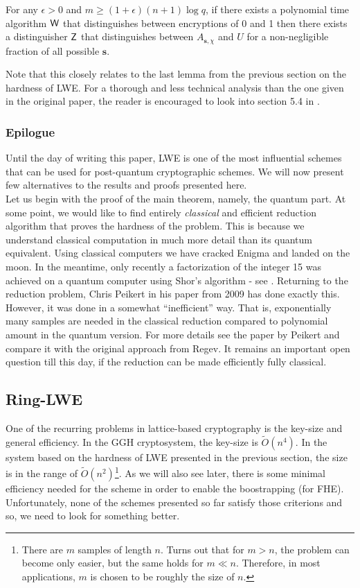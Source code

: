 \begin{proposition}
    For any $\epsilon > 0$ and $m \geq (1 + \epsilon)(n + 1) \log q$, if there exists a polynomial time algorithm $\alg{W}$ that distinguishes between encryptions of 0 and 1 then there exists a distinguisher $\alg{Z}$ that distinguishes between $A_{\bm{s}, \chi}$ and $U$ for a non-negligible fraction of all possible $\bm{s}$.
\end{proposition}
Note that this closely relates to the last lemma from the previous section on the hardness of LWE. For a thorough and less technical analysis than the one given in the original paper, the reader is encouraged to look into section 5.4 in \cite{Micci2009}.

\subsubsection*{Epilogue}
Until the day of writing this paper, LWE is one of the most influential schemes that can be used for post-quantum cryptographic schemes. We will now present few alternatives to the results and proofs presented here.\\

Let us begin with the proof of the main theorem, namely, the quantum part. At some point, we would like to find entirely \textit{classical} and efficient reduction algorithm that proves the hardness of the problem. This is because we understand classical computation in much more detail than its quantum equivalent. Using classical computers we have cracked Enigma and landed on the moon. In the meantime, only recently a factorization of the integer 15 was achieved on a quantum computer using Shor's algorithm - see . Returning to the reduction problem, Chris Peikert in his paper \cite{peikert_classical} from 2009 has done exactly this. However, it was done in a somewhat ``inefficient'' way. That is, exponentially many samples are needed in the classical reduction compared to polynomial amount in the quantum version. For more details see the paper by Peikert and compare it with the original approach from Regev. It remains an important open question  till this day, if the reduction can be made efficiently fully classical.

\subsection{Ring-LWE}
One of the recurring problems in lattice-based cryptography is the key-size and general efficiency. In the GGH cryptosystem, the key-size is $\tilde{O}(n^4)$. In the system based on the hardness of LWE presented in the previous section, the size is in the range of $\tilde{O}(n^2)$\footnote{There are $m$ samples of length $n$. Turns out that for $m > n$, the problem can become only easier, but the same holds for $m \ll n$. Therefore, in most applications, $m$ is chosen to be roughly the size of $n$.}. As we will also see later, there is some minimal efficiency needed for the scheme in order to enable the boostrapping (for FHE). Unfortunately, none of the schemes presented so far satisfy those criterions and so, we need to look for something better.


